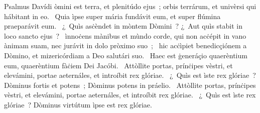 { Psalmus Davídi}
{%
òmini est terra, et plenitúdo ejus~; orbis terrárum, et univèrsi qui hábitant in eo. 
~Quia ìpse super mária fundávit eum, et super flúmina praeparávit eum. 
~¿~Quìs asċèndet in mòntem Dòmini~? ¿~Aut quìs stabit in loco sancto ejus~? 
~ìnnoċens mànibus et mùndo corde, qui non acċépit in vano ànimam suam, nec jurávit in dolo pròximo suo~; 
~hic acċìpiet benedicçiónem a Dòmino, et mizericórdiam a Deo salutári suo. 
~Haec est ġeneráçio quaerèntium eum, quaerèntium fàċiem Dei Jacóbi. 
~Attòllite portas, prínċipes vèstri, et elevámini, portae aeternáles, et introíbit rex glóriae. 
~¿~Quìs est ìste rex glóriae~? Dòminus fortis et potens~; Dòminus potens in práelio. 
~Attòllite portas, prínċipes vèstri, et elevámini, portae aeternáles, et introíbit rex glóriae. 
~¿~Quìs est ìste rex glóriae~? Dòminus virtútum ìpse est rex glóriae. 
}
